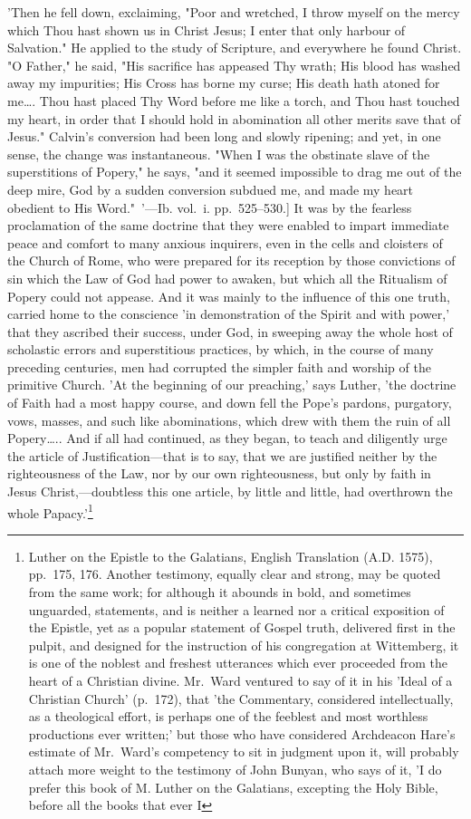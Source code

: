 \documentclass[
]{book}
\begin{document}
{  'Then he fell down, exclaiming, "Poor and wretched, I throw myself on the mercy which Thou hast shown us in Christ Jesus; I enter that only harbour of Salvation." He applied to the study of Scripture, and everywhere he found Christ. "O Father," he said, "His sacrifice has appeased Thy wrath; His blood has washed away my impurities; His Cross has borne my curse; His death hath atoned for me\ldots. Thou hast placed Thy Word before me like a torch, and Thou hast touched my heart, in order that I should hold in abomination all other merits save that of Jesus." Calvin's conversion had been long and slowly ripening; and yet, in one sense, the change was instantaneous. "When I was the obstinate slave of the superstitions of Popery," he says, "and it seemed impossible to drag me out of the deep mire, God by a sudden conversion subdued me, and made my heart obedient to His Word."~'---Ib. vol.~i. pp.~525--530.{]}} It was by the fearless proclamation of the same doctrine that they were enabled to impart immediate peace and comfort to many anxious inquirers, even in the cells and cloisters of the Church of Rome, who were prepared for its reception by those convictions of sin which the Law of God had power to awaken, but which all the Ritualism of Popery could not appease. And it was mainly to the influence of this one truth, carried home to the conscience 'in demonstration of the Spirit and with power,' that they ascribed their success, under God, in sweeping away the whole host of scholastic errors and superstitious practices, by which, in the course of many preceding centuries, men had corrupted the simpler faith and worship of the primitive Church. 'At the beginning of our preaching,' says Luther, 'the doctrine of Faith had a most happy course, and down fell the Pope's pardons, purgatory, vows, masses, and such like abominations, which drew with them the ruin of all Popery\ldots.. And if all had continued, as they began, to teach and diligently urge the article of Justification---that is to say, that we are justified neither by the righteousness of the Law, nor by our own righteousness, but only by faith in Jesus Christ,---doubtless this one article, by little and little, had overthrown the whole Papacy.'\footnote{Luther on the Epistle to the Galatians, English Translation (A.D. 1575), pp.~175, 176. Another testimony, equally clear and strong, may be quoted from the same work; for although it abounds in bold, and sometimes unguarded, statements, and is neither a learned nor a critical exposition of the Epistle, yet as a popular statement of Gospel truth, delivered first in the pulpit, and designed for the instruction of his congregation at Wittemberg, it is one of the noblest and freshest utterances which ever proceeded from the heart of a Christian divine. Mr.~Ward ventured to say of it in his 'Ideal of a Christian Church' (p.~172), that 'the Commentary, considered intellectually, as a theological effort, is perhaps one of the feeblest and most worthless productions ever written;' but those who have considered Archdeacon Hare's estimate of Mr.~Ward's competency to sit in judgment upon it, will probably attach more weight to the testimony of John Bunyan, who says of it, 'I do prefer this book of M. Luther on the Galatians, excepting the Holy Bible, before all the books that ever I }
\end{document}
